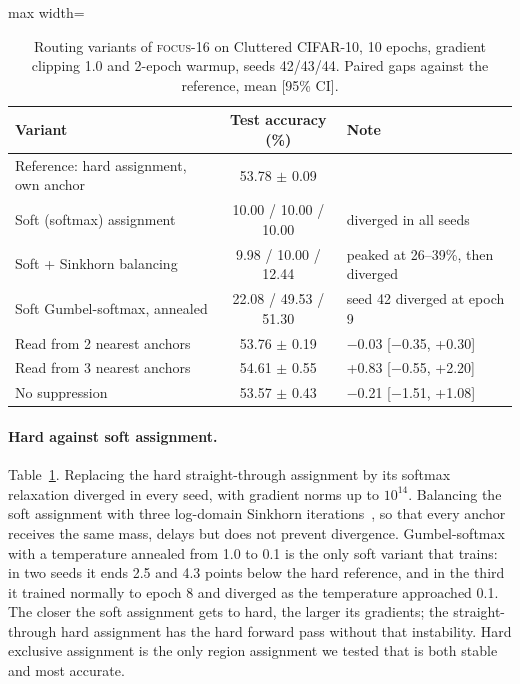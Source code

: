 \documentclass[runningheads]{llncs}
\newcommand{\focus}{\textsc{focus}}
\begin{document}
\begin{table}[t]
\centering
\caption{Routing variants of \focus-16 on Cluttered CIFAR-10, 10 epochs, gradient clipping 1.0
and 2-epoch warmup, seeds 42/43/44. Paired gaps against the reference, mean [95\% CI].}
\label{tab:ablation}
\begin{adjustbox}{max width=\linewidth}
\begin{tabular}{lcl}
\toprule
Variant & Test accuracy (\%) & Note \\
\midrule
Reference: hard assignment, own anchor & 53.78 $\pm$ 0.09 & \\
Soft (softmax) assignment & 10.00 / 10.00 / 10.00 & diverged in all seeds \\
Soft + Sinkhorn balancing & 9.98 / 10.00 / 12.44 & peaked at 26--39\%, then diverged \\
Soft Gumbel-softmax, annealed & 22.08 / 49.53 / 51.30 & seed 42 diverged at epoch 9 \\
Read from 2 nearest anchors & 53.76 $\pm$ 0.19 & $-$0.03 [$-$0.35, +0.30] \\
Read from 3 nearest anchors & 54.61 $\pm$ 0.55 & +0.83 [$-$0.55, +2.20] \\
No suppression & 53.57 $\pm$ 0.43 & $-$0.21 [$-$1.51, +1.08] \\
\bottomrule
\end{tabular}
\end{adjustbox}
\end{table}

\paragraph{Hard against soft assignment.} Table~\ref{tab:ablation}. Replacing the hard
straight-through assignment by its softmax relaxation diverged in every seed, with gradient norms
up to $10^{14}$. Balancing the soft assignment with three log-domain Sinkhorn
iterations~\cite{cuturi2013sinkhorn}, so that every anchor receives the same mass, delays but
does not prevent divergence. Gumbel-softmax~\cite{jang2017gumbel} with a temperature annealed
from 1.0 to 0.1 is the only soft variant that trains: in two seeds it ends 2.5 and 4.3 points
below the hard reference, and in the third it trained normally to epoch 8 and diverged as the
temperature approached 0.1. The closer the soft assignment gets to hard, the larger its gradients;
the straight-through hard assignment has the hard forward pass without that instability. Hard
exclusive assignment is the only region assignment we tested that is both stable and most
accurate.
\end{document}
